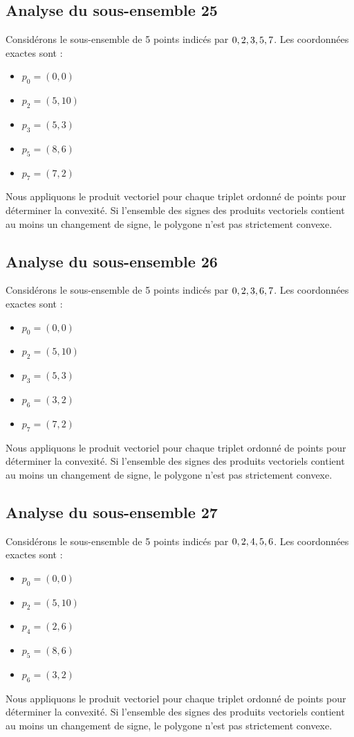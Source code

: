 \documentclass[11pt]{article}
\begin{document}
\subsection{Analyse du sous-ensemble 25}
Considérons le sous-ensemble de 5 points indicés par $\\{ 0, 2, 3, 5, 7 \\}$.
Les coordonnées exactes sont :
\begin{itemize}
\item $p_0 = (0, 0)$
\item $p_2 = (5, 10)$
\item $p_3 = (5, 3)$
\item $p_5 = (8, 6)$
\item $p_7 = (7, 2)$
\end{itemize}
Nous appliquons le produit vectoriel pour chaque triplet ordonné de points pour déterminer la convexité. Si l'ensemble des signes des produits vectoriels contient au moins un changement de signe, le polygone n'est pas strictement convexe.
\newpage

\subsection{Analyse du sous-ensemble 26}
Considérons le sous-ensemble de 5 points indicés par $\\{ 0, 2, 3, 6, 7 \\}$.
Les coordonnées exactes sont :
\begin{itemize}
\item $p_0 = (0, 0)$
\item $p_2 = (5, 10)$
\item $p_3 = (5, 3)$
\item $p_6 = (3, 2)$
\item $p_7 = (7, 2)$
\end{itemize}
Nous appliquons le produit vectoriel pour chaque triplet ordonné de points pour déterminer la convexité. Si l'ensemble des signes des produits vectoriels contient au moins un changement de signe, le polygone n'est pas strictement convexe.
\newpage

\subsection{Analyse du sous-ensemble 27}
Considérons le sous-ensemble de 5 points indicés par $\\{ 0, 2, 4, 5, 6 \\}$.
Les coordonnées exactes sont :
\begin{itemize}
\item $p_0 = (0, 0)$
\item $p_2 = (5, 10)$
\item $p_4 = (2, 6)$
\item $p_5 = (8, 6)$
\item $p_6 = (3, 2)$
\end{itemize}
Nous appliquons le produit vectoriel pour chaque triplet ordonné de points pour déterminer la convexité. Si l'ensemble des signes des produits vectoriels contient au moins un changement de signe, le polygone n'est pas strictement convexe.
\newpage
\end{document}
